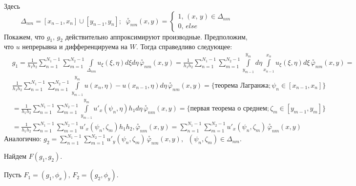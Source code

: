 \documentclass{article}
\begin{document}
Здесь
$$\Delta_{nm} = [x_{n-1}, x_n] \cup [y_{n-1}, y_n]; \;\;\overset{\circ}{\varphi}_{nm}(x,y) = \begin{cases} 1, \, (x,\,y) \in \Delta_{nm} \\ 0, \, else\end{cases}$$
Покажем, что $g_1,\, g_2$ действительно аппроксимируют производные. Предположим, что $u$ непрерывна и дифференцируема на $W$. Тогда справедливо следующее:
\begin{align*}
&g_1 = \frac{1}{h_1h_2} \sum \limits_{n=1}^{N_1 - 1} \sum \limits_{m=1}^{N_2 - 1} \int \limits _{\Delta_{nm}} u_\xi(\xi,\eta) d\xi d\eta \, \overset{\circ}{\varphi}_{nm}(x,y) = 
\frac{1}{h_1h_2} \sum \limits_{n=1}^{N_1 - 1} \sum \limits_{m=1}^{N_2 - 1} \int \limits _{y_{m-1}}^{y_m}  d\eta \int \limits_{x_{n-1}}^{x_n} u_\xi(\xi,\eta) d\xi \, \overset{\circ}{\varphi}_{nm}(x,y) =\\&  
\frac{1}{h_1h_2} \sum \limits_{n=1}^{N_1 - 1} \sum \limits_{m=1}^{N_2 - 1} \int \limits _{y_{m-1}}^{y_m} u(x_n,\eta) - u(x_{n-1}, \eta) d\eta\, \overset{\circ}{\varphi}_{nm}(x,y) = \{\text{теорема Лагранжа};\psi_n \in [x_{n-1}, x_n] \} \\&=
\frac{1}{h_1h_2} \sum \limits_{n=1}^{N_1 - 1} \sum \limits_{m=1}^{N_2 - 1} \int \limits _{y_{m-1}}^{y_m} u'_x(\psi_n,\eta)h_1 d\eta\, \overset{\circ}{\varphi}_{nm}(x,y) = \{ \text{первая теорема о среднем}; \zeta_m \in [y_{m-1}, y_m] \} \\&= 
\frac{1}{h_1h_2} \sum \limits_{n=1}^{N_1 - 1} \sum \limits_{m=1}^{N_2 - 1} u'_x(\psi_n,\zeta_m)h_1 h_2, \overset{\circ}{\varphi}_{nm}(x,y) = 
\sum \limits_{n=1}^{N_1 - 1} \sum \limits_{m=1}^{N_2 - 1} u'_x(\psi_n,\zeta_m) \, \overset{\circ}{\varphi}_{nm}(x,y)
\end{align*}
Аналогично:
$g_2 = \sum \limits_{n=1}^{N_1 - 1} \sum \limits_{m=1}^{N_2 - 1} u'_y(\psi_n,\zeta_m) \, \overset{\circ}{\varphi}_{nm}(x,y), \;\;(\psi_n, \zeta_m) \in \Delta_{nm}$.

Найдем $F(g_1,g_2)$. 

Пусть $F_1 = (g_1,\phi_x),\, F_2 = (g_2, \phi_y)$. 
\end{document}
